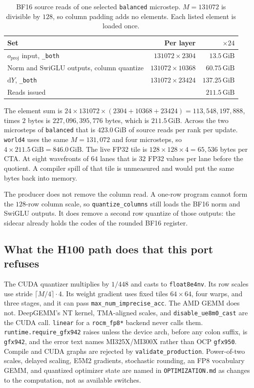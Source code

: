 \documentclass[11pt]{article}
\DeclareRobustCommand{\code}[1]{\texttt{#1}}
\newcommand{\GiB}{\,\mathrm{GiB}}
\begin{document}
\begin{table}[t]
\centering
\caption{BF16 source reads of one selected \code{balanced} microstep.
\(M=131072\) is divisible by \(128\), so column padding adds no elements.
Each listed element is loaded once.}
\label{tab:traffic}
\small
\begin{tabular}{@{}lrr@{}}
\toprule
Set & Per layer & \(\times 24\) \\
\midrule
\(o_{\mathrm{proj}}\) input, \code{\_both} & \(131072\times 2304\) & \(13.5\GiB\) \\
Norm and SwiGLU outputs, column quantize & \(131072\times 10368\) & \(60.75\GiB\) \\
\(\mathrm{d}Y\), \code{\_both} & \(131072\times 23424\) & \(137.25\GiB\) \\
\midrule
Reads issued & & \(211.5\GiB\) \\
\bottomrule
\end{tabular}
\end{table}

The element sum is \(24\times 131072\times(2304+10368+23424)=113{,}548{,}197{,}888\),
times \(2\) bytes is \(227{,}096{,}395{,}776\) bytes, which is \(211.5\GiB\).
Across the two microsteps of \code{balanced} that is \(423.0\GiB\) of source
reads per rank per update. \code{world4} uses the same \(M=131{,}072\) and
four microsteps, so \(4\times 211.5\GiB=846.0\GiB\). The live FP32 tile is
\(128\times 128\times 4=65{,}536\) bytes per CTA. At eight wavefronts of
\(64\) lanes that is \(32\) FP32 values per lane before the quotient. A
compiler spill of that tile is unmeasured and would put the same bytes back
into memory.

The producer does not remove the column read. A one-row program cannot form
the \(128\)-row column scale, so \code{quantize\_columns} still loads the
BF16 norm and SwiGLU outputs. It does remove a second row quantize of those
outputs: the sidecar already holds the codes of the rounded BF16 register.

\subsection{What the H100 path does that this port refuses}

The CUDA quantizer multiplies by \(1/448\) and casts to \code{float8e4nv}.
Its row scales use stride \(\lceil M/4\rceil\cdot 4\). Its weight gradient
uses fixed tiles \(64\times 64\), four warps, and three stages, and it can
pass \code{max\_num\_imprecise\_acc}. The AMD GEMM does not. DeepGEMM's NT
kernel, TMA-aligned scales, and \code{disable\_ue8m0\_cast} are the CUDA
call. \code{linear} for a \code{rocm\_fp8*} backend never calls them.
\code{runtime.require\_gfx942} raises unless the device arch, before any
colon suffix, is \code{gfx942}, and the error text names MI325X/MI300X rather
than OCP \code{gfx950}. Compile and CUDA graphs are rejected by
\code{validate\_production}. Power-of-two scales, delayed scaling, E5M2
gradients, stochastic rounding, an FP8 vocabulary GEMM, and quantized
optimizer state are named in \code{OPTIMIZATION.md} as changes to the
computation, not as available switches.
\end{document}

